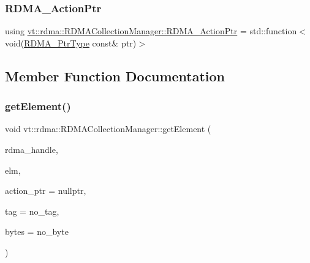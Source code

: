 \subsubsection{\texorpdfstring{R\+D\+M\+A\+\_\+\+Action\+Ptr}{RDMA\_ActionPtr}}
{\footnotesize\ttfamily using \hyperlink{structvt_1_1rdma_1_1_r_d_m_a_collection_manager_a4618a654161e92d2fcc2ab099eba9b65}{vt\+::rdma\+::\+R\+D\+M\+A\+Collection\+Manager\+::\+R\+D\+M\+A\+\_\+\+Action\+Ptr} =  std\+::function$<$void(\hyperlink{namespacevt_a9e2c953286c7616f7c218e9951790776}{R\+D\+M\+A\+\_\+\+Ptr\+Type} const\& ptr)$>$}



\subsection{Member Function Documentation}
\mbox{\label{structvt_1_1rdma_1_1_r_d_m_a_collection_manager_a3c189a72c3359cf3614c2477e9c1d919}} 
\subsubsection{\texorpdfstring{get\+Element()}{getElement()}}
{\footnotesize\ttfamily void vt\+::rdma\+::\+R\+D\+M\+A\+Collection\+Manager\+::get\+Element (\begin{DoxyParamCaption}\item[{\hyperlink{namespacevt_a10442579ec4e7ebef223818e64bcf908}{R\+D\+M\+A\+\_\+\+Handle\+Type} const \&}]{rdma\+\_\+handle,  }\item[{\hyperlink{namespacevt_a2c2a902092b72056f70210c159f966f0}{R\+D\+M\+A\+\_\+\+Elm\+Type} const \&}]{elm,  }\item[{\hyperlink{namespacevt_1_1rdma_aa07fa86d8eca8853254b40fc0e565726}{R\+D\+M\+A\+\_\+\+Recv\+Type}}]{action\+\_\+ptr = {\ttfamily nullptr},  }\item[{\hyperlink{namespacevt_a84ab281dae04a52a4b243d6bf62d0e52}{Tag\+Type} const \&}]{tag = {\ttfamily no\+\_\+tag},  }\item[{\hyperlink{namespacevt_aab8d55968084610ce3b17057981e9300}{Byte\+Type} const \&}]{bytes = {\ttfamily no\+\_\+byte} }\end{DoxyParamCaption})\hspace{0.3cm}{\ttfamily [static]}}

